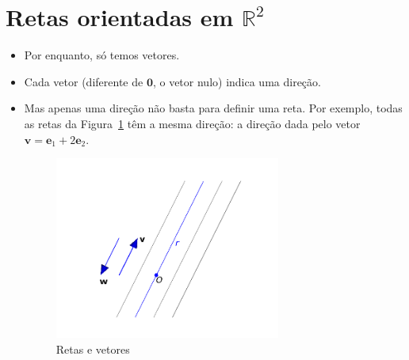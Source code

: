 \documentclass[
  letterpaper,
  DIV=11,
  numbers=noendperiod]{scrreprt}
\begin{document}
\hypertarget{sec-retas}{%
\section{\texorpdfstring{Retas orientadas em
$\mathbb{R}^2$}{Retas orientadas em }}\label{sec-retas}}

\begin{itemize}
\item
  Por enquanto, só temos vetores.
\item
  Cada vetor (diferente de $\mathbf{0}$, o vetor nulo) indica uma
  direção.
\item
  Mas apenas uma direção não basta para definir uma reta. Por exemplo,
  todas as retas da Figura~\ref{fig-retas} têm a mesma direção: a
  direção dada pelo vetor
  $\mathbf{v} = \mathbf{e}_{1} + 2\mathbf{e}_{2}$.

  \begin{figure}[htb]

  {\centering \includegraphics[width=0.7\textwidth,height=\textheight]{figures/fig-retas.png}

  }

  \caption{\label{fig-retas}Retas e vetores}


\end{figure}
\end{itemize}
\end{document}
